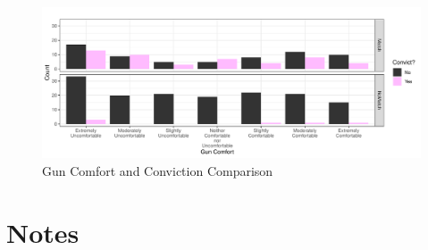 \documentclass[print]{nuthesis}
\begin{document}
\begin{figure}

{\centering \includegraphics[width=\linewidth]{thesis_files/figure-latex/convictscomfort-1} 

}

\caption{Gun Comfort and Conviction Comparison}\label{fig:convictscomfort}
\end{figure}

\hypertarget{notes-1}{%
\section{Notes}\label{notes-1}}
\end{document}
